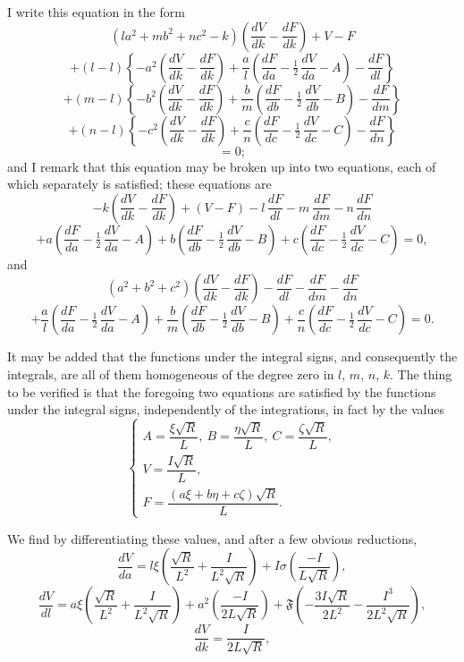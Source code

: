 \documentclass[11pt]{article}
\begin{document}
\medskip

\noindent I write this equation in the form
\[
(la^{2} + mb^{2} + nc^{2} - k)\left( \frac{dV}{dk} - \frac{dF}{dk}\right) + V - F
\]
\[
+ (l - l)\left\{-a^{2}\left(\frac{dV}{dk} - \frac{dF}{dk}\right) + \frac{a}{l}\left(\frac{dF}{da} - \tfrac{1}{2}\,\frac{dV}{da} - A\right) - \frac{dF}{dl}\right\}
\]
\[
+ (m - l)\left\{-b^{2}\left(\frac{dV}{dk} - \frac{dF}{dk}\right) + \frac{b}{m}\left(\frac{dF}{db} - \tfrac{1}{2}\,\frac{dV}{db} - B\right) - \frac{dF}{dm}\right\}
\]
\[
+ (n - l)\left\{-c^{2}\left(\frac{dV}{dk} - \frac{dF}{dk}\right) + \frac{c}{n}\left(\frac{dF}{dc} - \tfrac{1}{2}\,\frac{dV}{dc} - C\right) - \frac{dF}{dn}\right\}
\]
\[
= 0;
\]
and I remark that this equation may be broken up into two equations, each of which
separately is satisfied; these equations are
\[
- k\left(\frac{dV}{dk} - \frac{dF}{dk}\right) + (V - F) - l\,\frac{dF}{dl} - m\,\frac{dF}{dm} - n\,\frac{dF}{dn}
\]
\[
+ a\left(\frac{dF}{da} - \tfrac{1}{2}\,\frac{dV}{da} - A\right) + b\left(\frac{dF}{db} - \tfrac{1}{2}\,\frac{dV}{db} - B\right) + c\left(\frac{dF}{dc} - \tfrac{1}{2}\,\frac{dV}{dc} - C\right) = 0,
\]
and
\[
(a^{2} + b^{2} + c^{2})\left(\frac{dV}{dk} - \frac{dF}{dk}\right) - \frac{dF}{dl} - \frac{dF}{dm} - \frac{dF}{dn}
\]
\[
+ \frac{a}{l}\left(\frac{dF}{da} - \tfrac{1}{2}\,\frac{dV}{da} - A\right) + \frac{b}{m}\left(\frac{dF}{db} - \tfrac{1}{2}\,\frac{dV}{db} - B\right) + \frac{c}{n}\left(\frac{dF}{dc} - \tfrac{1}{2}\,\frac{dV}{dc} - C\right) = 0.
\]

It may be added that the functions under the integral signs, and consequently
the integrals, are all of them homogeneous of the degree zero in $l$, $m$, $n$, $k$. The
thing to be verified is that the foregoing two equations are satisfied by the functions
under the integral signs, independently of the integrations, in fact by the values
\[
\left\{\begin{array}{l}
A = \dfrac{\xi\sqrt{R}}{L},\ B = \dfrac{\eta\sqrt{R}}{L},\ C = \dfrac{\zeta\sqrt{R}}{L}, \\[4pt]
V = \dfrac{I\sqrt{R}}{L}, \\[4pt]
F = \dfrac{(a\xi + b\eta + c\zeta)\sqrt{R}}{L}.
\end{array}\right.
\]

We find by differentiating these values, and after a few obvious reductions,
\[
\frac{dV}{da} = l\xi\left(\frac{\sqrt{R}}{L^{2}} + \frac{I}{L^{2}\sqrt{R}}\right) + I\sigma\left(\frac{-I}{L\sqrt{R}}\right),
\]
\[
\frac{dV}{dl} = a\xi\left(\frac{\sqrt{R}}{L^{2}} + \frac{I}{L^{2}\sqrt{R}}\right) + a^{2}\left(\frac{-I}{2L\sqrt{R}}\right) + \mathfrak{F}\left(-\frac{3I\sqrt{R}}{2L^{2}} - \frac{I^{3}}{2L^{2}\sqrt{R}}\right),
\]
\[
\frac{dV}{dk} = \frac{I}{2L\sqrt{R}},
\]
\end{document}
